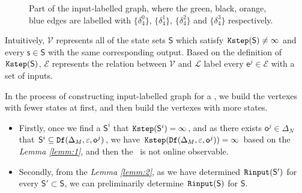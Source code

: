 \begin{figure}[thpb]
      \centering
      \caption{Part of the input-labelled graph, where the green, black, orange, blue edges are labelled with $\{\delta_4^0\}$, $\{\delta_4^1\}$, $\{\delta_4^2\}$ and $\{\delta_4^3\}$ respectively.}
      \label{fig:4}
\end{figure}

Intuitively, $\mathcal{V}$ represents all of the state sets $\mathsf{S}$ which satisfy ${\tt Kstep}(\mathsf{S})\ne \infty$ and every $\mathsf{s}\in\mathsf{S}$ with the same corresponding output. Based on the definition of ${\tt Kstep}(\mathsf{S})$, $\mathcal{E}$ represents the relation between $\mathcal{V}$ and $\mathcal{L}$ label every $\mathsf{e}^j \in\mathcal{E}$ with a set of inputs. %


In the process of constructing input-labelled graph for a \BCN, we build the vertexes with fewer states at first, and then build the vertexes with more states.
\begin{itemize}
\item  Firstly, once we find a $\mathsf{S}^i$ that ${\tt Kstep}(\mathsf{S}^i)= \infty$, and as there exists $\mathsf{o}^{j}\in \Delta_N$ that $\mathsf{S}^{i}\subseteq {\tt Df}(\Delta_M,\varepsilon, \mathsf{o}^{j})$, we have ${\tt Kstep}({\tt Df}(\Delta_M,\varepsilon, \mathsf{o}^{j}))= \infty$ based on the {\em Lemma \ref{lemm:1}}, and then the \BCN\ is not online observable.
\item  Secondly, from the {\em Lemma \ref{lemm:2}}, as we have determined ${\tt Rinput}(\mathsf{S}')$ for every $\mathsf{S}'\subset\mathsf{S}$, we can preliminarily determine ${\tt Rinput}(\mathsf{S})$ for $\mathsf{S}$.
 \end{itemize}
